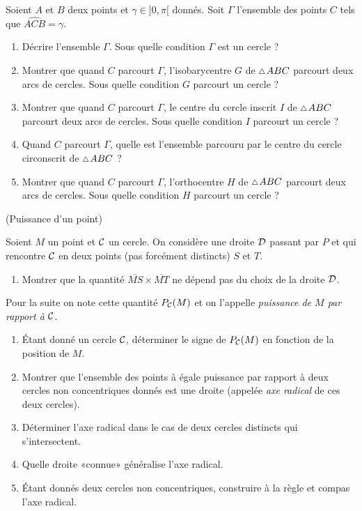 \documentclass[a4paper,11pt,reqno]{amsart}
\begin{document}
\begin{exo}

  Soient $A$ et $B$ deux points et $\gamma \in ]0,\pi[$ donnés. Soit $\Gamma$ l'ensemble des points $C$ tels que $\widehat{ACB}=\gamma$.
  \begin{enumerate}
    \item Décrire l'ensemble $\Gamma$. Sous quelle condition $\Gamma$ est un cercle ?
    \item Montrer que quand $C$ parcourt $\Gamma$, l'isobarycentre $G$ de $\tri ABC$ parcourt deux arcs de cercles. Sous quelle condition $G$ parcourt un cercle ?
    \item Montrer que quand $C$ parcourt $\Gamma$, le centre du cercle inscrit $I$ de $\tri ABC$ parcourt deux arcs de cercles. Sous quelle condition $I$ parcourt un cercle ?
    \item Quand $C$ parcourt $\Gamma$, quelle est l'ensemble parcouru par le centre du cercle circonscrit de $\tri ABC$ ?
    \item Montrer que quand $C$ parcourt $\Gamma$, l'orthocentre $H$ de $\tri ABC$ parcourt deux arcs de cercles. Sous quelle condition $H$ parcourt un cercle ?
  \end{enumerate}
\end{exo}

\begin{exo} (Puissance d'un point)

  Soient $M$ un point et $\mathcal{C}$ un cercle. On considère une droite $\mathcal{D}$ passant par $P$ et qui rencontre $\mathcal{C}$ en deux points (pas forcément distincts) $S$ et $T$.
  \begin{enumerate}
    \item Montrer que la quantité $\overline{MS}\times \overline{MT}$ ne dépend pas du choix de la droite $\mathcal{D}$.
  \end{enumerate}
  \begin{convention}
    Pour la suite on note cette quantité $P_{\mathcal{C}}(M)$ et on l'appelle \emph{puissance de $M$ par rapport à $\mathcal{C}$}.
  \end{convention}
  \begin{enumerate}[resume]
    \item Étant donné un cercle $\mathcal{C}$, déterminer le signe de $P_{\mathcal{C}}(M)$ en fonction de la position de $M$.
    \item Montrer que l'ensemble des points à égale puissance par rapport à deux cercles non concentriques donnés est une droite (appelée \emph{axe radical} de ces deux cercles).
    \item Déterminer l'axe radical dans le cas de deux cercles distincts qui s'intersectent.
    \item Quelle droite «connue» généralise l'axe radical.
    \item Étant donnés deux cercles non concentriques, construire à la règle et compas l'axe radical.
  \end{enumerate}
\end{exo}
\end{document}
